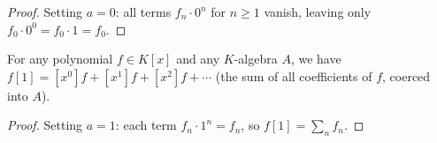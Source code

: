 \begin{proof}
\leanok
Setting $a=0$: all terms $f_{n}\cdot 0^{n}$ for $n\geq 1$ vanish, leaving
only $f_{0}\cdot 0^{0}=f_{0}\cdot 1=f_{0}$.
\end{proof}

\begin{lemma}
\label{lem.pol.eval.one}
\leanhelper
\leanok
For any polynomial $f\in K[x]$ and any $K$-algebra $A$, we have
$f[1]=\left[x^{0}\right]f+\left[x^{1}\right]f+\left[x^{2}\right]f+\cdots$
(the sum of all coefficients of $f$, coerced into $A$).
\end{lemma}

\begin{proof}
\leanok
Setting $a=1$: each term $f_{n}\cdot 1^{n}=f_{n}$, so
$f[1]=\sum_{n}f_{n}$.
\end{proof}
